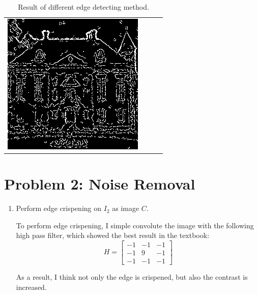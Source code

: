 \documentclass[12pt,a4paper,notitlepage,oneside,amsmath,amssymb]{article}
\begin{document}
\begin{CJK*}{UTF8}{bkai}
\begin{enumerate}[label=(\alph*)]
\begin{table}
\begin{tabular}[h!]{cccc}
			      \includegraphics[width=.25\linewidth]{E3_sample3}                                           \\
          \end{tabular}
          \caption{Result of different edge detecting method.}
        \end{table}
  \end{enumerate}

  \newpage

	\section*{Problem 2: Noise Removal}
	\begin{enumerate}[label=(\alph*)]
		\item Perform edge crispening on \(I_2\) as image \(C\).

		      To perform edge crispening, I simple convolute the image with the following high pass filter, which showed the best result in the textbook:
		      \[
			      H =
			      \begin{bmatrix}
				      -1 & -1 & -1 \\
				      -1 & 9  & -1 \\
				      -1 & -1 & -1
			      \end{bmatrix}
		      \]

		      As a result, I think not only the edge is crispened, but also the contrast is increased.


\end{enumerate}
\end{CJK*}
\end{document}
